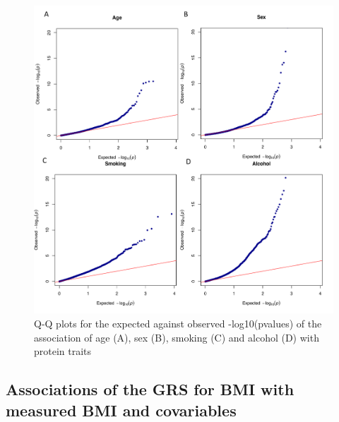 \documentclass[11pt,twoside]{bristolthesis}
\begin{document}
\begin{figure}
\includegraphics[width=0.95\linewidth]{figure/BMI_protein_INTERVAL/QQ_confounder_proteins} \caption[Q-Q plots of the expected against observed -log10(pvalues) for the associations between covariables and protein traits]{Q-Q plots for the expected against observed -log10(pvalues) of the association of age (A), sex (B), smoking (C) and alcohol (D) with protein traits}\label{fig:QQ-confounder-proteins}
\end{figure}
\hypertarget{associations-of-the-grs-for-bmi-with-measured-bmi-and-covariables}{%
\subsection{Associations of the GRS for BMI with measured BMI and covariables}\label{associations-of-the-grs-for-bmi-with-measured-bmi-and-covariables}}
\end{document}
